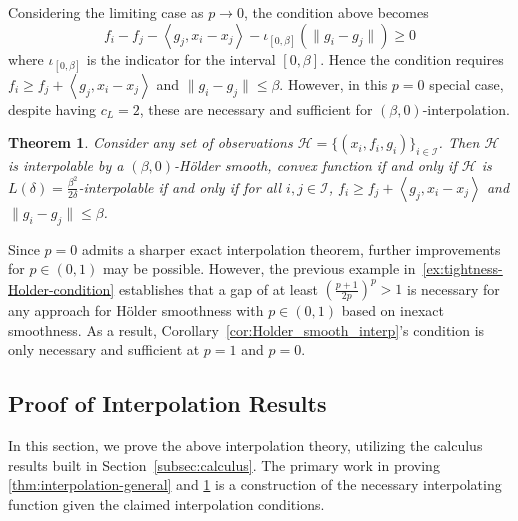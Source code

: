 \documentclass[11pt, hidelinks]{article}
\numberwithin{equation}{section}
\theoremstyle{thmstyletwo}%
\newtheorem{theorem}[thm]{Theorem}
\numberwithin{equation}{section}
\newcommand{\Ical}{\mathcal{I}}
\newcommand{\Holder}{H\"older }
\newcommand{\inner}[2]{\left\langle {#1}, {#2} \right\rangle}
\begin{document}
Considering the limiting case as $p \to 0$, the condition above becomes
$$f_i-f_j-\inner{g_j}{x_i-x_j}-\iota_{[0,\beta]}(\|g_i-g_j\|) \geq 0$$ where $\iota_{[0,\beta]}$ is the indicator for the interval $[0,\beta]$. Hence the condition requires $f_i \geq f_j + \inner{g_j}{x_i-x_j}$ and $\|g_i-g_j\| \leq \beta$. However, in this $p=0$ special case, despite having $c_L = 2$, these are necessary and sufficient for $(\beta,0)$-interpolation.
\begin{theorem}\label{thm:interpolation-p0}
    Consider any set of observations $\mathcal{H}=\{(x_i, f_i, g_i)\}_{i \in \Ical}$. Then $\mathcal{H}$ is interpolable by a $(\beta,0)$-\Holder smooth, convex function if and only if $\mathcal{H}$ is $L(\delta) = \frac{\beta^2}{2\delta}$-interpolable if and only if for all $i, j \in \Ical$, $f_i \geq f_j + \inner{g_j}{x_i-x_j}$ and $\|g_i-g_j\| \leq \beta$.
\end{theorem}
Since $p=0$ admits a sharper exact interpolation theorem, further improvements for $p \in (0,1)$ may be possible. However, the previous example in~\eqref{ex:tightness-Holder-condition} establishes that a gap of at least $\left(\frac{p+1}{2p}\right)^p >1$ is necessary for any approach for \Holder smoothness with $p \in (0,1)$ based on inexact smoothness. As a result, Corollary~\ref{cor:Holder_smooth_interp}'s condition is only necessary and sufficient at $p=1$ and $p=0$.








\subsection{Proof of Interpolation Results} \label{subsec:ProofOfInterpolation}





In this section, we prove the above interpolation theory, utilizing the calculus results built in Section~\ref{subsec:calculus}. The primary work in proving \cref{thm:interpolation-general} and \cref{thm:interpolation-p0} is a construction of the necessary interpolating function given the claimed interpolation conditions.
\end{document}

